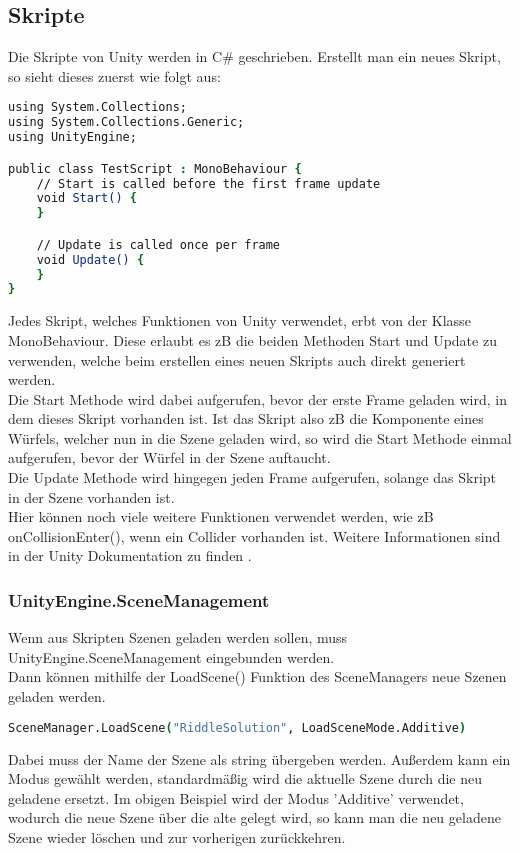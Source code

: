 \subsection{Skripte}
\label{sub:skripte}
Die Skripte von Unity werden in C\# geschrieben. Erstellt man ein neues Skript, so sieht dieses zuerst wie folgt aus:
\begin{lstlisting}[language=csh, caption={Generiertes Unity Skript}]
using System.Collections;
using System.Collections.Generic;
using UnityEngine;

public class TestScript : MonoBehaviour {
    // Start is called before the first frame update
    void Start() {
    }

	// Update is called once per frame
    void Update() {
    }
}
\end{lstlisting}
Jedes Skript, welches Funktionen von Unity verwendet, erbt von der Klasse MonoBehaviour.
Diese erlaubt es zB die beiden Methoden Start und Update zu verwenden, welche beim erstellen eines neuen Skripts auch direkt generiert werden.\\
Die Start Methode wird dabei aufgerufen, bevor der erste Frame geladen wird, in dem dieses Skript vorhanden ist. Ist das Skript also zB die Komponente eines Würfels, welcher nun in die Szene geladen wird, so wird die Start Methode einmal aufgerufen, bevor der Würfel in der Szene auftaucht.\\
Die Update Methode wird hingegen jeden Frame aufgerufen, solange das Skript in der Szene vorhanden ist. \\

Hier können noch viele weitere Funktionen verwendet werden, wie zB onCollisionEnter(), wenn ein Collider vorhanden ist. Weitere Informationen sind in der Unity Dokumentation zu finden \autocite{Unity:Doc}.

\subsubsection{UnityEngine.SceneManagement}
\label{Grundlagen:SceneManagement}
Wenn aus Skripten Szenen geladen werden sollen, muss UnityEngine.SceneManagement eingebunden werden.\\
Dann können mithilfe der LoadScene() Funktion des SceneManagers neue Szenen geladen werden.
\begin{lstlisting}[language=csh, caption={Laden einer Szene im Skript}]
SceneManager.LoadScene("RiddleSolution", LoadSceneMode.Additive)
\end{lstlisting}
Dabei muss der Name der Szene als string übergeben werden. Außerdem kann ein Modus gewählt werden, standardmäßig wird die aktuelle Szene durch die neu geladene ersetzt. Im obigen Beispiel wird der Modus 'Additive' verwendet, wodurch die neue Szene über die alte gelegt wird, so kann man die neu geladene Szene wieder löschen und zur vorherigen zurückkehren.

